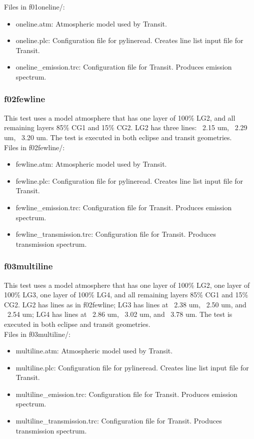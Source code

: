 \documentclass[letterpaper, 12pt]{article}
\begin{document}
Files in f01oneline/:
\begin{itemize} \itemsep0pt
  \item oneline.atm: Atmospheric model used by Transit.
  \item oneline.plc: Configuration file for pylineread. Creates line 
        list input file for Transit.
  \item oneline{\_}emission.trc: Configuration file for Transit. Produces 
        emission spectrum.
\end{itemize}

\subsubsection{f02fewline}
\label{sec:fewline}
This test uses a model atmosphere that has one layer of 100\% LG2, and all 
remaining layers 85\% CG1 and 15\% CG2. LG2 has three lines: ~2.15 um, 
~2.29 um, ~3.20 um. The test is executed in both eclipse and transit 
geometries.\\

Files in f02fewline/:
\begin{itemize} \itemsep0pt
  \item fewline.atm: Atmospheric model used by Transit.
  \item fewline.plc: Configuration file for pylineread. Creates line 
        list input file for Transit.
  \item fewline{\_}emission.trc: Configuration file for Transit. Produces 
        emission spectrum.
  \item fewline{\_}transmission.trc: Configuration file for Transit. Produces 
        transmission spectrum.
\end{itemize}

\subsubsection{f03multiline}
\label{sec:multiline}
This test uses a model atmosphere that has one layer of 100\% LG2, one layer 
of 100\% LG3, one layer of 100\% LG4, and all remaining layers 85\% CG1 and 
15\% CG2. LG2 has lines as in f02fewline; LG3 has lines at ~2.38 um, ~2.50 um, 
and ~2.54 um; LG4 has lines at ~2.86 um, ~3.02 um, and ~3.78 um. The test is 
executed in both eclipse and transit geometries.\\

Files in f03multiline/:
\begin{itemize} \itemsep0pt
  \item multiline.atm: Atmospheric model used by Transit.
  \item multiline.plc: Configuration file for pylineread. Creates line 
        list input file for Transit.
  \item multiline{\_}emission.trc: Configuration file for Transit. Produces 
        emission spectrum.
  \item multiline{\_}transmission.trc: Configuration file for Transit. Produces 
        transmission spectrum.
\end{itemize}
\end{document}
